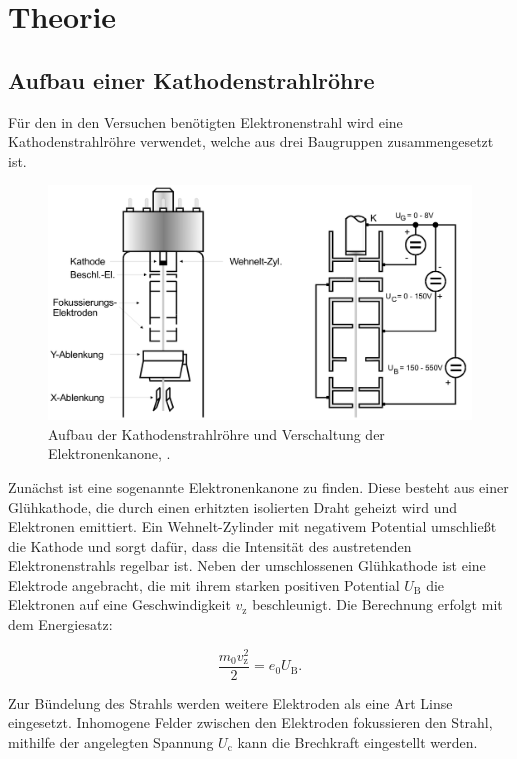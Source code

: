 \section{Theorie}
\label{sec:Theorie}

\subsection{Aufbau einer Kathodenstrahlröhre}
Für den in den Versuchen benötigten Elektronenstrahl wird eine Kathodenstrahlröhre verwendet, welche aus drei Baugruppen zusammengesetzt ist.

\begin{figure}[h!]
	\centering
	\includegraphics[width=0.9\linewidth]{../../kathodeaufbau}
	\caption{Aufbau der Kathodenstrahlröhre und Verschaltung der Elektronenkanone, \cite[2]{anleitung501}.}
	\label{fig:kathodeaufbau}
\end{figure}


Zunächst ist eine sogenannte Elektronenkanone zu finden. Diese besteht aus einer Glühkathode, die durch einen erhitzten isolierten Draht geheizt wird und Elektronen emittiert. Ein Wehnelt-Zylinder mit negativem
Potential umschließt die Kathode und sorgt dafür, dass die Intensität des austretenden Elektronenstrahls regelbar ist. Neben der umschlossenen Glühkathode ist eine Elektrode
angebracht, die mit ihrem starken positiven Potential $U_{\text{B}}$ die Elektronen auf eine Geschwindigkeit $v_{\text{z}}$ beschleunigt. Die Berechnung erfolgt mit dem Energiesatz:

\begin{equation}
\frac{m_0 v_{\text{z}}^2}{2} = e_0 U_{\text{B}}.
\label{eqn:energiesatz}
\end{equation}

Zur Bündelung des Strahls werden weitere Elektroden als eine Art Linse eingesetzt. Inhomogene Felder zwischen den Elektroden fokussieren den Strahl, mithilfe der angelegten Spannung $U_{\text{c}}$
kann die Brechkraft eingestellt werden. 

